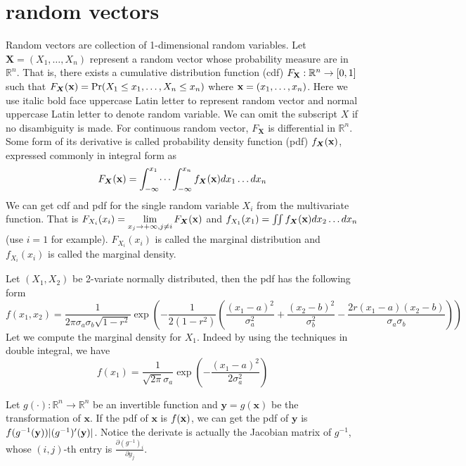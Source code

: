 \section{random vectors}
Random vectors are collection of 1-dimensional random variables. Let $\bm{X} = (X_1, \dots, X_n)$ 
represent a random vector whose probability measure are in $\mathbb{R}^n$.
That is, there exists a cumulative distribution function (cdf) $F_{\mathbf{X}}: \mathbb{R}^n \rightarrow [0,1]$ 
such that $F_{\bm{X}}(\mathbf{x}) = \Pr(X_1 \leq x_1, \dots, X_n \leq x_n)$ where $ \mathbf{x} = (x_1, \dots, x_n)$.
Here we use italic bold face uppercase Latin letter to represent random vector and normal uppercase Latin letter to denote random variable. We can omit the subscript $X$ if no disambiguity is made. For continuous random vector, $F_{\bm{X}}$ is differential in $\mathbb{R}^n$. Some form of its derivative is called probability density function (pdf) $f_{\bm{X}}(\mathbf{x})$, expressed commonly in integral form as
\begin{equation}
F_{\bm{X}}(\mathbf{x}) = \int_{-\infty}^{x_1}\dots\int_{-\infty}^{x_n} f_{\bm{X}}(\mathbf{x}) dx_1 \dots dx_n
\end{equation}
We can get cdf and pdf for the single random variable $X_i$ from the multivariate function. That is
$ F_{X_i}(x_i) = \displaystyle\lim_{x_j \to +\infty, j\neq i} F_{\bm{X}}(\mathbf{x})$ and 
$ f_{X_1}(x_1) = \iint f_{\bm{X}}(\mathbf{x})dx_2 \dots d x_n$ (use $i=1$ for example).
$F_{X_i}(x_i)$ is called the marginal distribution and $f_{X_i}(x_i)$ is called the marginal density.

\begin{example}\label{ex:g2}
	Let $(X_1, X_2)$ be 2-variate normally distributed, then the pdf has the following form
\begin{equation}
f(x_1, x_2) = \frac{1}{2\pi \sigma_a \sigma_b \sqrt{1-r^2}} \exp(-\frac{1}{2(1-r^2)} \left(\frac{(x_1-a)^2}{\sigma_a^2} + \frac{(x_2-b)^2}{\sigma_b^2} -\frac{2r(x_1-a)(x_2-b)}{\sigma_a \sigma_b}\right)) 
\end{equation}
Let we compute the marginal density for $X_1$. Indeed by using the techniques in double integral, we have
\begin{equation}
f(x_1) = \frac{1}{\sqrt{2\pi}\sigma_a} \exp(-\frac{(x_1-a)^2}{2\sigma_a^2})
\end{equation}

\end{example}
Let $g(\cdot): \mathbb{R}^n \to \mathbb{R}^n$ be an invertible function and $\bm{y} = g(\bm{x})$ be the transformation of $\bm{x}$.
If the pdf of $\bm{x}$ is $f(\mathbf{x})$, we can get the pdf of $\bm{y}$ is $f(g^{-1}(\mathbf{y})) \lvert(g^{-1})'(\mathbf{y})\rvert$. Notice the derivate is actually the Jacobian matrix of $g^{-1}$, whose $(i,j)$-th entry is $\frac{\partial (g^{-1})_i}{\partial y_j}$.

